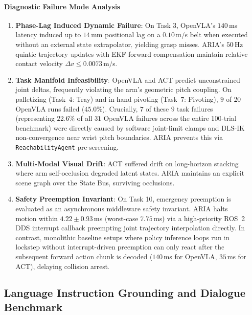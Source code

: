 \documentclass[journal]{IEEEtran}
\begin{document}
\paragraph{Diagnostic Failure Mode Analysis}
\begin{enumerate}
    \item \textbf{Phase-Lag Induced Dynamic Failure}: On Task 3, OpenVLA's $140$\,ms latency induced up to $14$\,mm positional lag on a $0.10$\,m/s belt when executed without an external state extrapolator, yielding grasp misses. ARIA's $50$\,Hz quintic trajectory updates with EKF forward compensation maintain relative contact velocity $\Delta v \le 0.0073$\,m/s.
    \item \textbf{Task Manifold Infeasibility}: OpenVLA and ACT predict unconstrained joint deltas, frequently violating the arm's geometric pitch coupling. On palletizing (Task~4: Tray) and in-hand pivoting (Task~7: Pivoting), $9$ of $20$ OpenVLA runs failed ($45.0\%$). Crucially, $7$ of these $9$ task failures (representing $22.6\%$ of all $31$ OpenVLA failures across the entire 100-trial benchmark) were directly caused by software joint-limit clamps and DLS-IK non-convergence near wrist pitch boundaries. ARIA prevents this via \texttt{ReachabilityAgent} pre-screening.
    \item \textbf{Multi-Modal Visual Drift}: ACT suffered drift on long-horizon stacking where arm self-occlusion degraded latent states. ARIA maintains an explicit scene graph over the State Bus, surviving occlusions.
    \item \textbf{Safety Preemption Invariant}: On Task 10, emergency preemption is evaluated as an asynchronous middleware safety invariant. ARIA halts motion within $4.22 \pm 0.93$\,ms (worst-case $7.75$\,ms) via a high-priority ROS~2 DDS interrupt callback preempting joint trajectory interpolation directly. In contrast, monolithic baseline setups where policy inference loops run in lockstep without interrupt-driven preemption can only react after the subsequent forward action chunk is decoded ($140$\,ms for OpenVLA, $35$\,ms for ACT), delaying collision arrest.
\end{enumerate}

\subsection{Language Instruction Grounding and Dialogue Benchmark}
\label{sec_language_benchmark}
\end{document}
